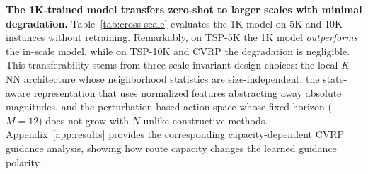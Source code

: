 \documentclass[sigconf]{acmart}
\begin{document}

\smallskip\noindent\textbf{The 1K-trained model transfers zero-shot to larger scales with minimal degradation.}
Table~\ref{tab:cross-scale} evaluates the 1K model on 5K and 10K instances without retraining.
Remarkably, on TSP-5K the 1K model \emph{outperforms} the in-scale model, while on TSP-10K and CVRP the degradation is negligible.
This transferability stems from three scale-invariant design choices: the local $K$-NN architecture whose neighborhood statistics are size-independent, the state-aware representation that uses normalized features abstracting away absolute magnitudes, and the perturbation-based action space whose fixed horizon ($M{=}12$) does not grow with $N$ unlike constructive methods.
Appendix~\ref{app:results} provides the corresponding capacity-dependent CVRP guidance analysis, showing how route capacity changes the learned guidance polarity.
\end{document}
